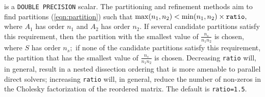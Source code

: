 \documentclass{stfc}
\begin{document}
\begin{description}

 is a {\tt DOUBLE PRECISION} scalar. The partitioning and refinement
methods aim to find partitions (\ref{eqn:partition}) such that
$\max(n_1,n_2)<\min(n_1,n_2)\times{\tt ratio},$ where $A_1$ has order $n_1$ and
$A_2$ has order $n_2.$ If several candidate partitions satisfy this requirement,
then the partition with the smallest value of $\frac{n_s}{n_1 n_2}$ is chosen,
where $S$ has order $n_s;$ if none of the candidate partitions satisfy this
requirement, the partition that has the smallest value of
$\frac{n_s}{n_1 n_2}$ is chosen. Decreasing {\tt ratio} will, in
general, result in a nested dissection ordering that is more amenable to
parallel direct solvers; increasing {\tt ratio} will, in general, reduce the
number of non-zeros in the Cholesky factorization of the reordered matrix. The
default is {\tt ratio=1.5}.




\end{description}
\end{document}
